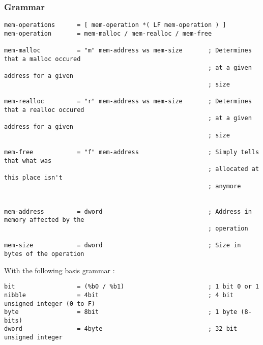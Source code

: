 \subsubsection{Grammar}
\begin{verbatim}
mem-operations      = [ mem-operation *( LF mem-operation ) ]
mem-operation       = mem-malloc / mem-realloc / mem-free

mem-malloc          = "m" mem-address ws mem-size       ; Determines that a malloc occured 
                                                        ; at a given address for a given 
                                                        ; size

mem-realloc         = "r" mem-address ws mem-size       ; Determines that a realloc occured
                                                        ; at a given address for a given 
                                                        ; size

mem-free            = "f" mem-address                   ; Simply tells that what was 
                                                        ; allocated at this place isn't 
                                                        ; anymore


mem-address         = dword                             ; Address in memory affected by the
                                                        ; operation 

mem-size            = dword                             ; Size in bytes of the operation
\end{verbatim}

With the following basis grammar : 
\begin{verbatim}
bit                 = (%b0 / %b1)                       ; 1 bit 0 or 1
nibble              = 4bit                              ; 4 bit unsigned integer (0 to F)
byte                = 8bit                              ; 1 byte (8-bits)
dword               = 4byte                             ; 32 bit unsigned integer
\end{verbatim}

